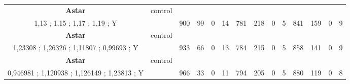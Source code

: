 \begin{table}[]
{\begin{tabular}{|c|c|c|c|c|c|c|c|c|c|c|c|c|c|}
\cellcolor{blue!15}\textbf{Astar} & control& {\color[HTML]{00009B} } & {\color[HTML]{9A0000} } & {\color[HTML]{009901} } &  & {\color[HTML]{00009B} } & {\color[HTML]{9A0000} } & {\color[HTML]{009901} } &  & {\color[HTML]{00009B} } & {\color[HTML]{9A0000} } & {\color[HTML]{009901} } &  \\ 
\cellcolor{ blue!15}1,13 ; 1,15 ; 1,17 ; 1,19 ; Y &  & \multirow{-2}{*}{{\color[HTML]{00009B} 900}} & \multirow{-2}{*}{{\color[HTML]{9A0000} 99}} & \multirow{-2}{*}{{\color[HTML]{009901} 0}} & \multirow{-2}{*}{14} & \multirow{-2}{*}{{\color[HTML]{00009B} 781}} & \multirow{-2}{*}{{\color[HTML]{9A0000} 218}} & \multirow{-2}{*}{{\color[HTML]{009901} 0}} & \multirow{-2}{*}{5} & \multirow{-2}{*}{{\color[HTML]{00009B} 841}} & \multirow{-2}{*}{{\color[HTML]{9A0000} 159}} & \multirow{-2}{*}{{\color[HTML]{009901} 0}} & \multirow{-2}{*}{9} \\ \hline

\cellcolor{blue!15}\textbf{Astar} & control& {\color[HTML]{00009B} } & {\color[HTML]{9A0000} } & {\color[HTML]{009901} } &  & {\color[HTML]{00009B} } & {\color[HTML]{9A0000} } & {\color[HTML]{009901} } &  & {\color[HTML]{00009B} } & {\color[HTML]{9A0000} } & {\color[HTML]{009901} } &  \\ 
\cellcolor{ blue!15}1,23308 ; 1,26326 ; 1,11807 ; 0,99693 ; Y &  & \multirow{-2}{*}{{\color[HTML]{00009B} 933}} & \multirow{-2}{*}{{\color[HTML]{9A0000} 66}} & \multirow{-2}{*}{{\color[HTML]{009901} 0}} & \multirow{-2}{*}{13} & \multirow{-2}{*}{{\color[HTML]{00009B} 784}} & \multirow{-2}{*}{{\color[HTML]{9A0000} 215}} & \multirow{-2}{*}{{\color[HTML]{009901} 0}} & \multirow{-2}{*}{5} & \multirow{-2}{*}{{\color[HTML]{00009B} 858}} & \multirow{-2}{*}{{\color[HTML]{9A0000} 141}} & \multirow{-2}{*}{{\color[HTML]{009901} 0}} & \multirow{-2}{*}{9} \\ \hline

\cellcolor{blue!15}\textbf{Astar} & control& {\color[HTML]{00009B} } & {\color[HTML]{9A0000} } & {\color[HTML]{009901} } &  & {\color[HTML]{00009B} } & {\color[HTML]{9A0000} } & {\color[HTML]{009901} } &  & {\color[HTML]{00009B} } & {\color[HTML]{9A0000} } & {\color[HTML]{009901} } &  \\ 
\cellcolor{ blue!15}0,946981 ; 1,120938 ; 1,126149 ; 1,23813 ; Y &  & \multirow{-2}{*}{{\color[HTML]{00009B} 966}} & \multirow{-2}{*}{{\color[HTML]{9A0000} 33}} & \multirow{-2}{*}{{\color[HTML]{009901} 0}} & \multirow{-2}{*}{11} & \multirow{-2}{*}{{\color[HTML]{00009B} 794}} & \multirow{-2}{*}{{\color[HTML]{9A0000} 205}} & \multirow{-2}{*}{{\color[HTML]{009901} 0}} & \multirow{-2}{*}{5} & \multirow{-2}{*}{{\color[HTML]{00009B} 880}} & \multirow{-2}{*}{{\color[HTML]{9A0000} 119}} & \multirow{-2}{*}{{\color[HTML]{009901} 0}} & \multirow{-2}{*}{8} \\ \hline


\end{tabular}}
\end{table}
